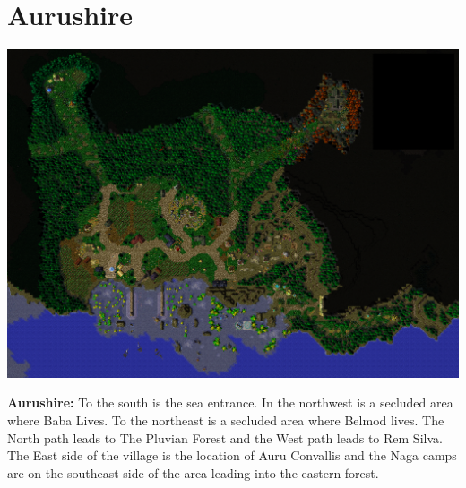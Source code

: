 \documentclass[letterpaper,10pt,twoside,twocolumn,openany]{book}
\begin{document}
\section{Aurushire}
\begin{center}
	\includegraphics[width=\linewidth]{img/Aurushire.png}
	
	{\textbf{Aurushire:} To the south is the sea entrance. In the northwest is a secluded area where Baba Lives. To the northeast is a secluded area where Belmod lives. The North path leads to The Pluvian Forest and the West path leads to Rem Silva. The East side of the village is the location of Auru Convallis and the Naga camps are on the southeast side of the area leading into the eastern forest.}
\end{center}

\end{document}
